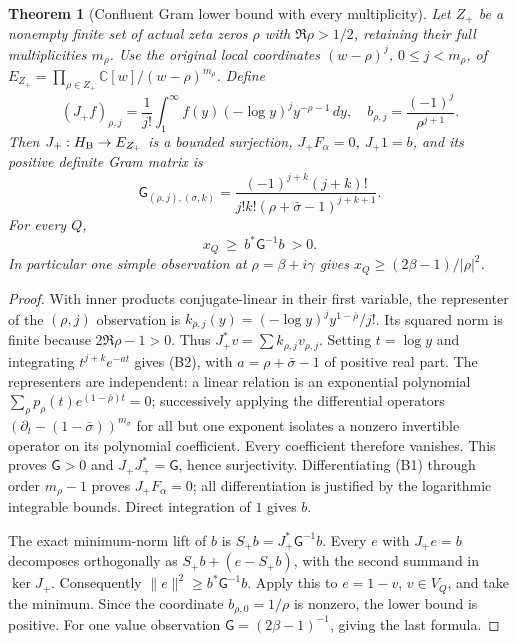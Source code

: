 \documentclass[11pt]{article}
\newtheorem{theorem}{Theorem}[section]
\newcommand{\C}{\mathbb C}\newcommand{\R}{\mathbb R}
\begin{document}
\begin{theorem}[Confluent Gram lower bound with every multiplicity]\label{thm:NB-jets}
Let $Z_+$ be a nonempty finite set of actual zeta zeros
$\rho$ with $\Re\rho>1/2$, retaining their full multiplicities $m_\rho$.
Use the original local coordinates $(w-\rho)^j$, $0\leq j<m_\rho$,
of $E_{Z_+}=\prod_{\rho\in Z_+}\C[w]/(w-\rho)^{m_\rho}$.
Define
\[
 (J_+f)_{\rho,j}=\frac1{j!}\int_1^\infty
            f(y)(-\log y)^j y^{-\rho-1}\,dy,
 \quad b_{\rho,j}=\frac{(-1)^j}{\rho^{j+1}}.
\]
Then $J_+:H_{\rm B}\to E_{Z_+}$ is a bounded surjection,
$J_+F_\alpha=0$, $J_+1=b$, and its positive definite Gram matrix is
\[
 \mathsf G_{(\rho,j),(\sigma,k)}
  =\frac{(-1)^{j+k}(j+k)!}
     {j!k!(\rho+\bar\sigma-1)^{j+k+1}}.\tag{B2}
\]
For every $Q$,
\[
 x_Q\ \geq\ b^*\mathsf G^{-1}b\ >0.\tag{B3}
\]
In particular one simple observation at $\rho=\beta+i\gamma$ gives
$x_Q\geq(2\beta-1)/|\rho|^2$.
\end{theorem}
\begin{proof}
With inner products conjugate-linear in their first variable, the
representer of the $(\rho,j)$ observation is
$k_{\rho,j}(y)=(-\log y)^j y^{1-\bar\rho}/j!$.
Its squared norm is finite because $2\Re\rho-1>0$.
Thus $J_+^*v=\sum k_{\rho,j}v_{\rho,j}$.
Setting $t=\log y$ and integrating $t^{j+k}e^{-at}$ gives (B2), with
$a=\rho+\bar\sigma-1$ of positive real part.
The representers are independent: a linear relation is an
exponential polynomial $\sum_\rho p_\rho(t)e^{(1-\bar\rho)t}=0$;
successively applying the differential operators
$(\partial_t-(1-\bar\sigma))^{m_\sigma}$ for all but one exponent
isolates a nonzero invertible operator on its polynomial coefficient.
Every coefficient therefore vanishes. This proves $\mathsf G>0$ and
$J_+J_+^*=\mathsf G$, hence surjectivity.
Differentiating (B1) through order $m_\rho-1$ proves $J_+F_\alpha=0$;
all differentiation is justified by the logarithmic integrable bounds.
Direct integration of $1$ gives $b$.

The exact minimum-norm lift of $b$ is
$S_+b=J_+^*\mathsf G^{-1}b$.
Every $e$ with $J_+e=b$ decomposes orthogonally as
$S_+b+(e-S_+b)$, with the second summand in $\ker J_+$.
Consequently $\|e\|^2\geq b^*\mathsf G^{-1}b$.
Apply this to $e=1-v$, $v\in V_Q$, and take the minimum. Since the
coordinate $b_{\rho,0}=1/\rho$ is nonzero, the lower bound is positive.
For one value observation $\mathsf G=(2\beta-1)^{-1}$, giving the last
formula.
\end{proof}
\end{document}
